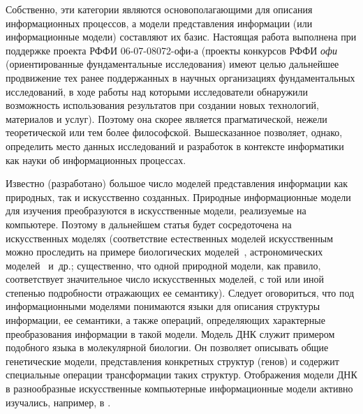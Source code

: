 \begin{multicols}{2}
Собственно, эти категории являются основополагающими для описания
информационных процессов, а модели представления информации (или
информационные модели) составляют их базис. Настоящая работа
выполнена при поддержке проекта РФФИ 06-07-08072-офи-а
(проекты конкурсов РФФИ {\it офи} (ориентированные фундаментальные
исследования) имеют целью дальнейшее продвижение тех ранее поддержанных
в научных организациях фундаментальных исследований, в ходе работы над
которыми исследователи обнаружили возможность использования результатов
при создании новых технологий, материалов и услуг).
Поэтому она скорее
является прагматической, нежели теоретической или тем более
философской. Вышесказанное позволяет, однако, определить место данных
исследований и разработок в контексте информатики как науки об
информационных процессах.
{

}

Известно (разработано) большое число моделей представления информации
как природных, так и искусственно созданных. Природные информационные
модели для изучения преобразуются в искусственные модели, реализуемые
на компьютере. Поэтому в дальнейшем статья будет сосредоточена на
искусственных моделях (соответствие естественных моделей искусственным
можно проследить на примере биологических моделей~\cite{ Kr01, Br03},
астрономических моделей~\cite{dmo04, Ca06} и~др.; существенно, что одной природной
модели, как правило, соответствует значительное число искусственных
моделей, с той или иной степенью подробности отражающих ее семантику).
Следует оговориться, что под информационными моделями понимаются языки
для описания структуры информации, ее семантики, а также операций,
определяющих характерные преобразования информации в такой модели.
Модель ДНК служит примером подобного языка в молекулярной биологии.
Он позволяет описывать общие генетические модели, представления
конкретных структур (генов) и содержит специальные операции
трансформации таких структур. Отображения модели ДНК в разнообразные
искусственные компьютерные информационные модели активно изуча\-лись,
 например, в \cite{Br03}.


\end{multicols}
